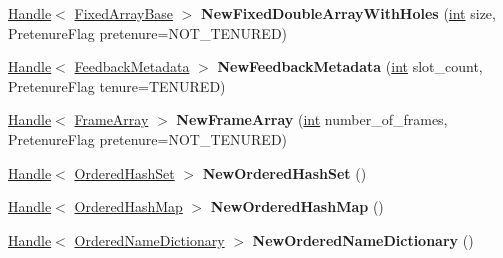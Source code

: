 \begin{DoxyCompactItemize}
\mbox{\hyperlink{classv8_1_1internal_1_1Handle}{Handle}}$<$ \mbox{\hyperlink{classv8_1_1internal_1_1FixedArrayBase}{Fixed\+Array\+Base}} $>$ {\bfseries New\+Fixed\+Double\+Array\+With\+Holes} (\mbox{\hyperlink{classint}{int}} size, Pretenure\+Flag pretenure=N\+O\+T\+\_\+\+T\+E\+N\+U\+R\+ED)
\item 
\mbox{\label{classv8_1_1internal_1_1Factory_a8543b28b668788ede553b52538f43179}} 
\mbox{\hyperlink{classv8_1_1internal_1_1Handle}{Handle}}$<$ \mbox{\hyperlink{classv8_1_1internal_1_1FeedbackMetadata}{Feedback\+Metadata}} $>$ {\bfseries New\+Feedback\+Metadata} (\mbox{\hyperlink{classint}{int}} slot\+\_\+count, Pretenure\+Flag tenure=T\+E\+N\+U\+R\+ED)
\item 
\mbox{\label{classv8_1_1internal_1_1Factory_a32704a01246e952b32de3cc3adc8bb55}} 
\mbox{\hyperlink{classv8_1_1internal_1_1Handle}{Handle}}$<$ \mbox{\hyperlink{classv8_1_1internal_1_1FrameArray}{Frame\+Array}} $>$ {\bfseries New\+Frame\+Array} (\mbox{\hyperlink{classint}{int}} number\+\_\+of\+\_\+frames, Pretenure\+Flag pretenure=N\+O\+T\+\_\+\+T\+E\+N\+U\+R\+ED)
\item 
\mbox{\label{classv8_1_1internal_1_1Factory_a912e53bcc0bf576897691b77f4a353cd}} 
\mbox{\hyperlink{classv8_1_1internal_1_1Handle}{Handle}}$<$ \mbox{\hyperlink{classv8_1_1internal_1_1OrderedHashSet}{Ordered\+Hash\+Set}} $>$ {\bfseries New\+Ordered\+Hash\+Set} ()
\item 
\mbox{\label{classv8_1_1internal_1_1Factory_aa4664bf7567b848c542e740f44d70b5c}} 
\mbox{\hyperlink{classv8_1_1internal_1_1Handle}{Handle}}$<$ \mbox{\hyperlink{classv8_1_1internal_1_1OrderedHashMap}{Ordered\+Hash\+Map}} $>$ {\bfseries New\+Ordered\+Hash\+Map} ()
\item 
\mbox{\label{classv8_1_1internal_1_1Factory_af39253bf4f0dc71798d72a3442c9ad3b}} 
\mbox{\hyperlink{classv8_1_1internal_1_1Handle}{Handle}}$<$ \mbox{\hyperlink{classv8_1_1internal_1_1OrderedNameDictionary}{Ordered\+Name\+Dictionary}} $>$ {\bfseries New\+Ordered\+Name\+Dictionary} ()
\item 
\mbox{\label{classv8_1_1internal_1_1Factory_ad36eeb1e745dcc519ba33f0f776e6804}} 

\end{DoxyCompactItemize}
